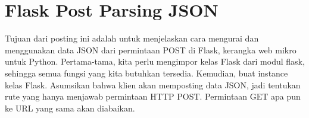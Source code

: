 \section{Flask Post Parsing JSON}
Tujuan dari posting ini adalah untuk menjelaskan cara mengurai dan menggunakan data JSON dari permintaan POST di Flask, kerangka web mikro untuk Python. Pertama-tama, kita perlu mengimpor kelas Flask dari modul flask, sehingga semua fungsi yang kita butuhkan tersedia. Kemudian, buat instance kelas Flask. Asumsikan bahwa klien akan memposting data JSON, jadi tentukan rute yang hanya menjawab permintaan HTTP POST. Permintaan GET apa pun ke URL yang sama akan diabaikan\cite{dwyer2016flask}.


